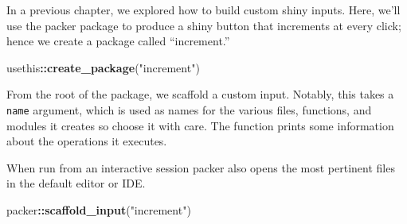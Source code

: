 \documentclass[
]{krantz}
\makeatletter
\newenvironment{Shaded}{\begin{snugshade}}{\end{snugshade}}
\newcommand{\KeywordTok}[1]{\textcolor[rgb]{0.27,0.27,0.27}{\textbf{#1}}}
\newcommand{\NormalTok}[1]{#1}
\newcommand{\OperatorTok}[1]{\textcolor[rgb]{0.43,0.43,0.43}{\textbf{#1}}}
\newcommand{\StringTok}[1]{\textcolor[rgb]{0.5,0.5,0.5}{#1}}
\newenvironment{kframe}{%
\medskip{}
\setlength{\fboxsep}{.8em}
 \def\at@end@of@kframe{}%
 \ifinner\ifhmode%
  \def\at@end@of@kframe{\end{minipage}}%
  \begin{minipage}{\columnwidth}%
 \fi\fi%
 \def\FrameCommand##1{\hskip\@totalleftmargin \hskip-\fboxsep
 \colorbox{shadecolor}{##1}\hskip-\fboxsep
     \hskip-\linewidth \hskip-\@totalleftmargin \hskip\columnwidth}%
 \MakeFramed {\advance\hsize-\width
   \@totalleftmargin\z@ \linewidth\hsize
   \@setminipage}}%
 {\par\unskip\endMakeFramed%
 \at@end@of@kframe}
\renewenvironment{Shaded}{\begin{kframe}}{\end{kframe}}
\makeatother
\begin{document}
In a previous chapter, we explored how to build custom shiny inputs. Here, we'll use the packer package to produce a shiny button that increments at every click; hence we create a package called ``increment.''

\begin{Shaded}
\begin{Highlighting}[]
\NormalTok{usethis}\OperatorTok{::}\KeywordTok{create\_package}\NormalTok{(}\StringTok{"increment"}\NormalTok{)}
\end{Highlighting}
\end{Shaded}

From the root of the package, we scaffold a custom input. Notably, this takes a \texttt{name} argument, which is used as names for the various files, functions, and modules it creates so choose it with care. The function prints some information about the operations it executes.

When run from an interactive session packer also opens the most pertinent files in the default editor or IDE.

\begin{Shaded}
\begin{Highlighting}[]
\NormalTok{packer}\OperatorTok{::}\KeywordTok{scaffold\_input}\NormalTok{(}\StringTok{"increment"}\NormalTok{)}
\end{Highlighting}
\end{Shaded}
\end{document}
